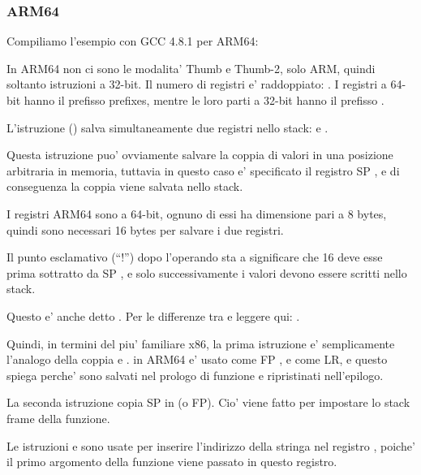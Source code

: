 \subsubsection{ARM64}


Compiliamo l'esempio con GCC 4.8.1 per ARM64:



In ARM64 non ci sono le modalita' Thumb e Thumb-2, solo ARM, quindi soltanto istruzioni a 32-bit.
Il numero di registri e' raddoppiato: .
I registri a 64-bit hanno il prefisso  prefixes, mentre le loro parti a 32-bit hanno il prefisso \EMDASH{}.

L'istruzione  () 
salva simultaneamente due registri nello stack:  e .

Questa istruzione puo' ovviamente salvare la coppia di valori in una posizione arbitraria in memoria, tuttavia in questo caso e'
specificato il registro \ac{SP} , e di conseguenza la coppia viene salvata nello stack.

I registri ARM64 sono a 64-bit, ognuno di essi ha dimensione pari a 8 bytes, quindi sono necessari 16 bytes per salvare i due registri.

Il punto esclamativo (``!'') dopo l'operando sta a significare che 16 deve esse prima sottratto da \ac{SP} , e solo successivamente
i valori devono essere scritti nello stack.

Questo e' anche detto .
Per le differenze tra  e  
leggere qui: .

Quindi, in termini del piu' familiare x86, la prima istruzione e' semplicamente l'analogo della coppia
 e .
 in ARM64 e' usato come \ac{FP} , e  
come \ac{LR}, e questo spiega perche' sono salvati nel prologo di funzione e ripristinati nell'epilogo.

La seconda istruzione copia \ac{SP} in  (o \ac{FP}).
Cio' viene fatto per impostare lo stack frame della funzione.

\label{pointers_ADRP_and_ADD}
Le istruzioni  e \ADD sono usate per inserire
l'indirizzo della stringa  nel registro  , 
poiche' il primo argomento della funzione viene passato in questo registro.

